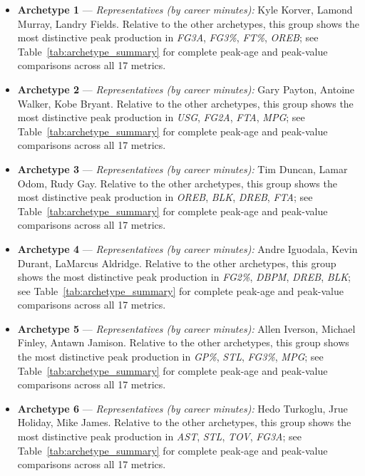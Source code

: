 \begin{itemize}
\item \textbf{Archetype 1} --- \emph{Representatives (by career minutes):} Kyle Korver, Lamond Murray, Landry Fields. Relative to the other archetypes, this group shows the most distinctive peak production in \textit{FG3A}, \textit{FG3\%}, \textit{FT\%}, \textit{OREB}; see Table~\ref{tab:archetype_summary} for complete peak-age and peak-value comparisons across all 17 metrics.
\item \textbf{Archetype 2} --- \emph{Representatives (by career minutes):} Gary Payton, Antoine Walker, Kobe Bryant. Relative to the other archetypes, this group shows the most distinctive peak production in \textit{USG}, \textit{FG2A}, \textit{FTA}, \textit{MPG}; see Table~\ref{tab:archetype_summary} for complete peak-age and peak-value comparisons across all 17 metrics.
\item \textbf{Archetype 3} --- \emph{Representatives (by career minutes):} Tim Duncan, Lamar Odom, Rudy Gay. Relative to the other archetypes, this group shows the most distinctive peak production in \textit{OREB}, \textit{BLK}, \textit{DREB}, \textit{FTA}; see Table~\ref{tab:archetype_summary} for complete peak-age and peak-value comparisons across all 17 metrics.
\item \textbf{Archetype 4} --- \emph{Representatives (by career minutes):} Andre Iguodala, Kevin Durant, LaMarcus Aldridge. Relative to the other archetypes, this group shows the most distinctive peak production in \textit{FG2\%}, \textit{DBPM}, \textit{DREB}, \textit{BLK}; see Table~\ref{tab:archetype_summary} for complete peak-age and peak-value comparisons across all 17 metrics.
\item \textbf{Archetype 5} --- \emph{Representatives (by career minutes):} Allen Iverson, Michael Finley, Antawn Jamison. Relative to the other archetypes, this group shows the most distinctive peak production in \textit{GP\%}, \textit{STL}, \textit{FG3\%}, \textit{MPG}; see Table~\ref{tab:archetype_summary} for complete peak-age and peak-value comparisons across all 17 metrics.
\item \textbf{Archetype 6} --- \emph{Representatives (by career minutes):} Hedo Turkoglu, Jrue Holiday, Mike James. Relative to the other archetypes, this group shows the most distinctive peak production in \textit{AST}, \textit{STL}, \textit{TOV}, \textit{FG3A}; see Table~\ref{tab:archetype_summary} for complete peak-age and peak-value comparisons across all 17 metrics.
\end{itemize}
